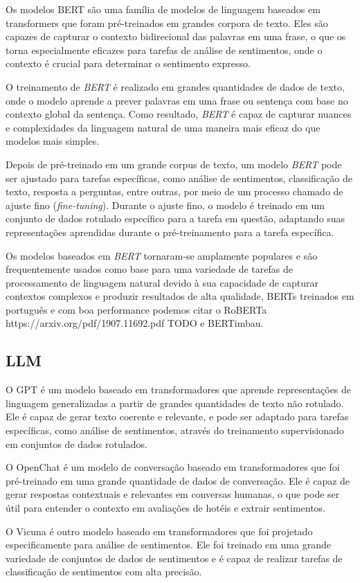 Os modelos BERT são uma família de modelos de linguagem baseados em transformers que foram pré-treinados em grandes corpora de texto. Eles são capazes de capturar o contexto bidirecional das palavras em uma frase, o que os torna especialmente eficazes para tarefas de análise de sentimentos, onde o contexto é crucial para determinar o sentimento expresso.

O treinamento de \emph{BERT} é realizado em grandes quantidades de dados de texto, onde o modelo aprende a prever palavras em uma frase ou sentença com base no contexto global da sentença. Como resultado, \emph{BERT} é capaz de capturar nuances e complexidades da linguagem natural de uma maneira mais eficaz do que modelos mais simples.

Depois de pré-treinado em um grande corpus de texto, um modelo \emph{BERT} pode ser ajustado para tarefas específicas, como análise de sentimentos, classificação de texto, resposta a perguntas, entre outras, por meio de um processo chamado de ajuste fino (\textit{fine-tuning}). Durante o ajuste fino, o modelo é treinado em um conjunto de dados rotulado específico para a tarefa em questão, adaptando suas representações aprendidas durante o pré-treinamento para a tarefa específica.

Os modelos baseados em \emph{BERT} tornaram-se amplamente populares e são frequentemente usados como base para uma variedade de tarefas de processamento de linguagem natural devido à sua capacidade de capturar contextos complexos e produzir resultados de alta qualidade, BERTs treinados em português e com boa performance podemos citar o RoBERTa {https://arxiv.org/pdf/1907.11692.pdf} TODO e BERTimbau.

\subsection[Large Language Models]{LLM}
\label{cap:fund_teorica:sec:modelos:subsec:LLM}

O GPT é um modelo baseado em transformadores que aprende representações de linguagem generalizadas a partir de grandes quantidades de texto não rotulado. Ele é capaz de gerar texto coerente e relevante, e pode ser adaptado para tarefas específicas, como análise de sentimentos, através do treinamento supervisionado em conjuntos de dados rotulados.

O OpenChat \cite{wang2023openchat}  é um modelo de conversação baseado em transformadores que foi pré-treinado em uma grande quantidade de dados de conversação. Ele é capaz de gerar respostas contextuais e relevantes em conversas humanas, o que pode ser útil para entender o contexto em avaliações de hotéis e extrair sentimentos.

O Vicuna \cite{vicuna2023} é outro modelo baseado em transformadores que foi projetado especificamente para análise de sentimentos. Ele foi treinado em uma grande variedade de conjuntos de dados de sentimentos e é capaz de realizar tarefas de classificação de sentimentos com alta precisão.

